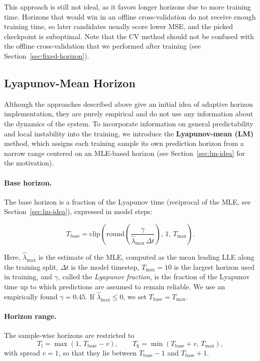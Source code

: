 \documentclass{article}
\begin{document}
This approach is still not ideal, as it favors longer horizons due to more training time. Horizons that would win in an offline cross-validation do not receive enough training time, so later candidates usually score lower MSE, and the picked checkpoint is suboptimal. Note that the CV method should not be confused with the offline cross-validation that we performed after training (see Section~\ref{sec:fixed-horizon}).

\subsection{Lyapunov-Mean Horizon}
\label{sec:lm}

Although the approaches described above give an initial idea of adaptive horizon implementation, they are purely empirical and do not use any information about the dynamics of the system. To incorporate information on general predictability and local instability into the training, we introduce the \textbf{Lyapunov-mean (LM)} method, which assigns each training sample its own prediction horizon from a narrow range centered on an MLE-based horizon (see Section~\ref{sec:lm-idea} for the motivation).

\paragraph{Base horizon.}
The base horizon is a fraction of the Lyapunov time (reciprocal of the MLE, see Section~\ref{sec:lm-idea}), expressed in model steps:

\begin{equation} \label{eq:t-base}
T_{\mathrm{base}} = \mathrm{clip}\left( \mathrm{round}\left( \frac{\gamma}{\hat\lambda_{\max}\,\Delta t} \right),\, 1,\, T_{\max} \right).
\end{equation}

Here, $\hat\lambda_{\max}$ is the estimate of the MLE, computed as the mean leading LLE along the training split, $\Delta t$ is the model timestep, $T_{\max} = 10$ is the largest horizon used in training, and $\gamma$, called the \emph{Lyapunov fraction}, is the fraction of the Lyapunov time up to which predictions are assumed to remain reliable. We use an empirically found $\gamma = 0.45$. If $\hat\lambda_{\max} \le 0$, we set $T_{\mathrm{base}} = T_{\max}$.

\paragraph{Horizon range.}
The sample-wise horizons are restricted to
\[
T_{\mathrm{l}} = \max(1,\, T_{\mathrm{base}} - v), \qquad T_{\mathrm{h}} = \min(T_{\mathrm{base}} + v,\, T_{\max}),
\]
with spread $v = 1$, so that they lie between $T_{\mathrm{base}} - 1$ and $T_{\mathrm{base}} + 1$.
\end{document}
